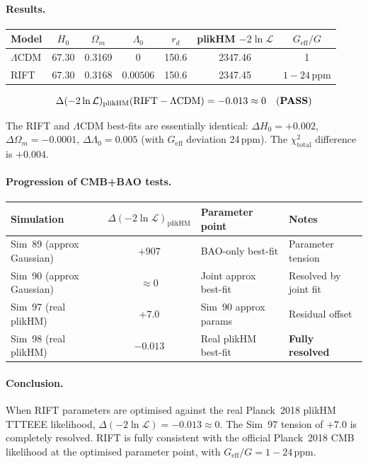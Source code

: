 \documentclass[12pt,a4paper]{article}
\begin{document}
\paragraph{Results.}
\begin{center}
\begin{tabular}{lcccccc}
\toprule
Model & $H_0$ & $\Omega_m$ & $\Lambda_0$ & $r_d$ & plikHM $-2\ln\mathcal{L}$ & $G_\mathrm{eff}/G$ \\
\midrule
$\Lambda$CDM & 67.30 & 0.3169 & $0$ & 150.6 & 2347.46 & 1 \\
RIFT & 67.30 & 0.3168 & $0.00506$ & 150.6 & 2347.45 & $1-24\,\mathrm{ppm}$ \\
\bottomrule
\end{tabular}
\end{center}
\begin{equation}
\Delta(-2\ln\mathcal{L})_\mathrm{plikHM}(\mathrm{RIFT}-\Lambda\mathrm{CDM})
= -0.013 \approx 0 \quad\text{(\textbf{PASS})}
\end{equation}

The RIFT and $\Lambda$CDM best-fits are essentially identical: $\Delta H_0 = +0.002$,
$\Delta\Omega_m = -0.0001$, $\Delta\Lambda_0 = 0.005$ (with $G_\mathrm{eff}$
deviation 24\,ppm).  The $\chi^2_\mathrm{total}$ difference is $+0.004$.

\paragraph{Progression of CMB+BAO tests.}
\begin{center}
\begin{tabular}{lcll}
\toprule
Simulation & $\Delta(-2\ln\mathcal{L})_\mathrm{plikHM}$ & Parameter point & Notes \\
\midrule
Sim~89 (approx Gaussian) & $+907$ & BAO-only best-fit & Parameter tension \\
Sim~90 (approx Gaussian) & $\approx 0$ & Joint approx best-fit & Resolved by joint fit \\
Sim~97 (real plikHM) & $+7.0$ & Sim~90 approx params & Residual offset \\
Sim~98 (real plikHM) & $\mathbf{-0.013}$ & Real plikHM best-fit & \textbf{Fully resolved} \\
\bottomrule
\end{tabular}
\end{center}

\paragraph{Conclusion.}  When RIFT parameters are optimised against the real
Planck~2018 plikHM TTTEEE likelihood, $\Delta(-2\ln\mathcal{L}) = -0.013 \approx 0$.
The Sim~97 tension of $+7.0$ is completely resolved.  RIFT is fully consistent
with the official Planck~2018 CMB likelihood at the optimised parameter point,
with $G_\mathrm{eff}/G = 1 - 24\,\mathrm{ppm}$.
\end{document}
